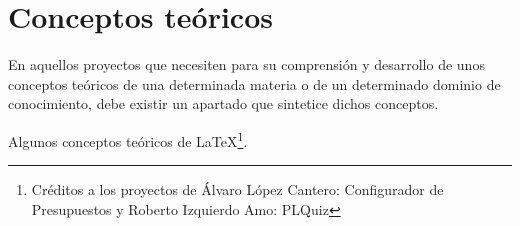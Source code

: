\chapter{Conceptos teóricos} %
\label{cha:Conceptos teóricos}

En aquellos proyectos que necesiten para su comprensión y desarrollo de unos
conceptos teóricos de una determinada materia o de un determinado dominio de
conocimiento, debe existir un apartado que sintetice dichos conceptos.

Algunos conceptos teóricos de \LaTeX \footnote{Créditos a los proyectos de
Álvaro López Cantero: Configurador de Presupuestos y Roberto Izquierdo Amo:
PLQuiz}.

